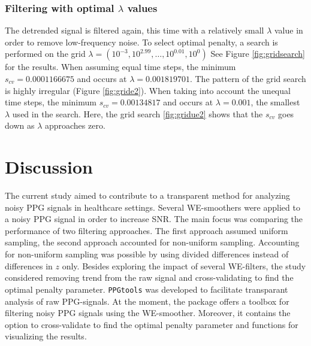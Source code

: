 \documentclass[twocolumn]{bmcart}%
\begin{document}
\subsubsection*{Filtering with optimal $\lambda$ values}
The detrended signal is filtered again, this time with a relatively small $\lambda$ value in order to remove low-frequency noise. 
To select optimal penalty, a search is performed on the grid $\lambda = (10^{-3}, 10^{2.99}, \dots ,10^{0.01}, 10^0)$ 
See Figure \ref{fig:gridsearch} for the results. 
When assuming equal time steps, the minimum $s_{cv} = 0.0001166675$ and occurs at $\lambda = 0.001819701$.
The pattern of the grid search is highly irregular (Figure \ref{fig:gride2}).
When taking into account the unequal time steps, the minimum $s_{cv} = 0.00134817$ and occurs at $\lambda = 0.001$, the smallest $\lambda$ used in the search.
Here, the grid search \ref{fig:gridue2} shows that the $s_{cv}$ goes down as $\lambda$ approaches zero. 


\section*{Discussion} 
The current study aimed to contribute to a transparent method for analyzing noisy PPG signals in healthcare settings. 
Several WE-smoothers were applied to a noisy PPG signal in order to increase SNR. 
The main focus was comparing the performance of two filtering approaches. 
The first approach assumed uniform sampling, the second approach accounted for non-uniform sampling.
Accounting for non-uniform sampling was possible by using divided differences instead of differences in $z$ only.
Besides exploring the impact of several WE-filters, the study considered removing trend from the raw signal and cross-validating to find the optimal penalty parameter. 
\verb|PPGtools| was developed to facilitate transparant analysis of raw PPG-signals.   
At the moment, the package offers a toolbox for filtering noisy PPG signals using the WE-smoother. 
Moreover, it contains the option to cross-validate to find the optimal penalty parameter and functions for visualizing the results.
\end{document}
